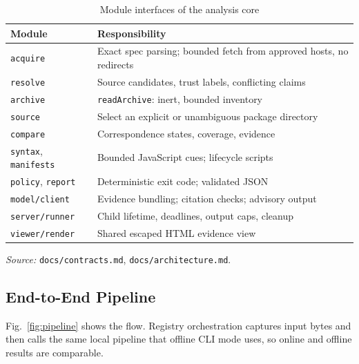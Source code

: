 \documentclass[conference]{IEEEtran}
\newcommand{\code}[1]{\texttt{#1}}
\begin{document}
\begin{table}[t]
\caption{Module interfaces of the analysis core}
\label{tab:modules}
\centering
\footnotesize
\begin{tabular}{@{}p{2.3cm}p{5.3cm}@{}}
\toprule
\textbf{Module} & \textbf{Responsibility}\\
\midrule
\code{acquire} & Exact spec parsing; bounded fetch from approved hosts, no redirects\\
\code{resolve} & Source candidates, trust labels, conflicting claims\\
\code{archive} & \code{readArchive}: inert, bounded inventory\\
\code{source} & Select an explicit or unambiguous package directory\\
\code{compare} & Correspondence states, coverage, evidence\\
\code{syntax}, \code{manifests} & Bounded JavaScript cues; lifecycle scripts\\
\code{policy}, \code{report} & Deterministic exit code; validated JSON\\
\code{model/client} & Evidence bundling; citation checks; advisory output\\
\code{server/runner} & Child lifetime, deadlines, output caps, cleanup\\
\code{viewer/render} & Shared escaped HTML evidence view\\
\bottomrule
\end{tabular}
\vspace{1pt}

\textit{Source:} \code{docs/contracts.md}, \code{docs/architecture.md}.
\end{table}

\subsection{End-to-End Pipeline}
Fig.~\ref{fig:pipeline} shows the flow. Registry orchestration captures input
bytes and then calls the same local pipeline that offline CLI mode uses, so
online and offline results are comparable.
\end{document}
